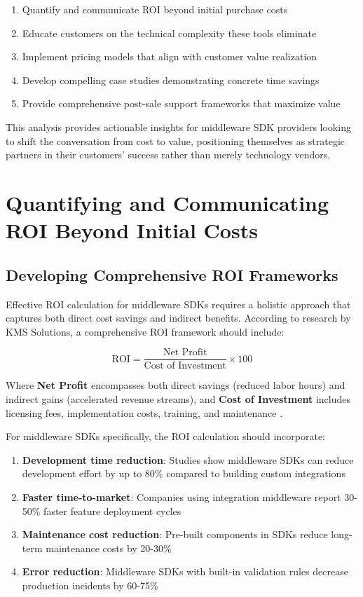 \documentclass[11pt,a4paper]{article}
\begin{document}
\begin{enumerate}
    \item Quantify and communicate ROI beyond initial purchase costs
    \item Educate customers on the technical complexity these tools eliminate
    \item Implement pricing models that align with customer value realization
    \item Develop compelling case studies demonstrating concrete time savings
    \item Provide comprehensive post-sale support frameworks that maximize value
\end{enumerate}

This analysis provides actionable insights for middleware SDK providers looking to shift the conversation from cost to value, positioning themselves as strategic partners in their customers' success rather than merely technology vendors.

\section{Quantifying and Communicating ROI Beyond Initial Costs}

\subsection{Developing Comprehensive ROI Frameworks}

Effective ROI calculation for middleware SDKs requires a holistic approach that captures both direct cost savings and indirect benefits. According to research by KMS Solutions, a comprehensive ROI framework should include:

\begin{equation}
\text{ROI} = \frac{\text{Net Profit}}{\text{Cost of Investment}} \times 100
\end{equation}

Where \textbf{Net Profit} encompasses both direct savings (reduced labor hours) and indirect gains (accelerated revenue streams), and \textbf{Cost of Investment} includes licensing fees, implementation costs, training, and maintenance \cite{kms2023}.

For middleware SDKs specifically, the ROI calculation should incorporate:

\begin{enumerate}
    \item \textbf{Development time reduction}: Studies show middleware SDKs can reduce development effort by up to 80\% compared to building custom integrations \cite{prismatic2023}
    \item \textbf{Faster time-to-market}: Companies using integration middleware report 30-50\% faster feature deployment cycles \cite{aws2023}
    \item \textbf{Maintenance cost reduction}: Pre-built components in SDKs reduce long-term maintenance costs by 20-30\% \cite{haveignition2023}
    \item \textbf{Error reduction}: Middleware SDKs with built-in validation rules decrease production incidents by 60-75\% \cite{haveignition2023}
\end{enumerate}
\end{document}
